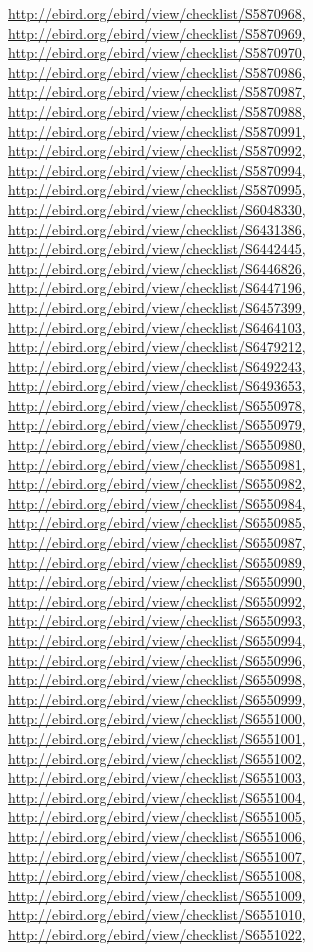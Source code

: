 \documentclass[9pt, article]{memoir}
\begin{document}
\begin{multicols}{2}
\url{http://ebird.org/ebird/view/checklist/S5870968}, 
\url{http://ebird.org/ebird/view/checklist/S5870969}, 
\url{http://ebird.org/ebird/view/checklist/S5870970}, 
\url{http://ebird.org/ebird/view/checklist/S5870986}, 
\url{http://ebird.org/ebird/view/checklist/S5870987}, 
\url{http://ebird.org/ebird/view/checklist/S5870988}, 
\url{http://ebird.org/ebird/view/checklist/S5870991}, 
\url{http://ebird.org/ebird/view/checklist/S5870992}, 
\url{http://ebird.org/ebird/view/checklist/S5870994}, 
\url{http://ebird.org/ebird/view/checklist/S5870995}, 
\url{http://ebird.org/ebird/view/checklist/S6048330}, 
\url{http://ebird.org/ebird/view/checklist/S6431386}, 
\url{http://ebird.org/ebird/view/checklist/S6442445}, 
\url{http://ebird.org/ebird/view/checklist/S6446826}, 
\url{http://ebird.org/ebird/view/checklist/S6447196}, 
\url{http://ebird.org/ebird/view/checklist/S6457399}, 
\url{http://ebird.org/ebird/view/checklist/S6464103}, 
\url{http://ebird.org/ebird/view/checklist/S6479212}, 
\url{http://ebird.org/ebird/view/checklist/S6492243}, 
\url{http://ebird.org/ebird/view/checklist/S6493653}, 
\url{http://ebird.org/ebird/view/checklist/S6550978}, 
\url{http://ebird.org/ebird/view/checklist/S6550979}, 
\url{http://ebird.org/ebird/view/checklist/S6550980}, 
\url{http://ebird.org/ebird/view/checklist/S6550981}, 
\url{http://ebird.org/ebird/view/checklist/S6550982}, 
\url{http://ebird.org/ebird/view/checklist/S6550984}, 
\url{http://ebird.org/ebird/view/checklist/S6550985}, 
\url{http://ebird.org/ebird/view/checklist/S6550987}, 
\url{http://ebird.org/ebird/view/checklist/S6550989}, 
\url{http://ebird.org/ebird/view/checklist/S6550990}, 
\url{http://ebird.org/ebird/view/checklist/S6550992}, 
\url{http://ebird.org/ebird/view/checklist/S6550993}, 
\url{http://ebird.org/ebird/view/checklist/S6550994}, 
\url{http://ebird.org/ebird/view/checklist/S6550996}, 
\url{http://ebird.org/ebird/view/checklist/S6550998}, 
\url{http://ebird.org/ebird/view/checklist/S6550999}, 
\url{http://ebird.org/ebird/view/checklist/S6551000}, 
\url{http://ebird.org/ebird/view/checklist/S6551001}, 
\url{http://ebird.org/ebird/view/checklist/S6551002}, 
\url{http://ebird.org/ebird/view/checklist/S6551003}, 
\url{http://ebird.org/ebird/view/checklist/S6551004}, 
\url{http://ebird.org/ebird/view/checklist/S6551005}, 
\url{http://ebird.org/ebird/view/checklist/S6551006}, 
\url{http://ebird.org/ebird/view/checklist/S6551007}, 
\url{http://ebird.org/ebird/view/checklist/S6551008}, 
\url{http://ebird.org/ebird/view/checklist/S6551009}, 
\url{http://ebird.org/ebird/view/checklist/S6551010}, 
\url{http://ebird.org/ebird/view/checklist/S6551022}, 

\end{multicols}
\end{document}
